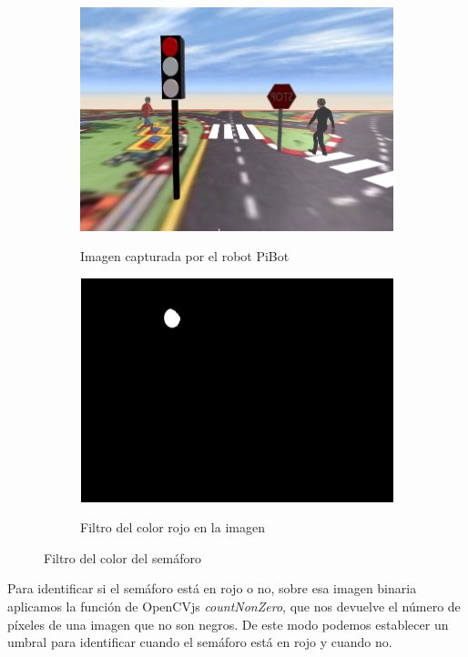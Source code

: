 \documentclass{report}
\begin{document}
\renewcommand{\figurename}{Figura}		
\begin{figure}[!h]
\centering
  \begin{subfigure}[b]{0.49\textwidth}
  \centering
    \includegraphics[scale=0.25]{images/cap4/rojo2.png}
    \label{fig:f1}
    \caption{Imagen capturada por el robot PiBot}
  \end{subfigure}
  \hfill
  \begin{subfigure}[b]{0.49\textwidth}
  \centering
    \includegraphics[scale=0.5]{images/cap4/rojo-filtrado.png}
    \label{fig:f2}
    \caption{Filtro del color rojo en la imagen}
  \end{subfigure}
  \caption{Filtro del color del semáforo}
\end{figure}

Para identificar si el semáforo está en rojo o no, sobre esa imagen binaria aplicamos la función de OpenCVjs \textit{countNonZero}, que nos devuelve el número de píxeles de una imagen que no son negros. De este modo podemos establecer un umbral para identificar cuando el semáforo está en rojo y cuando no.
\end{document}
